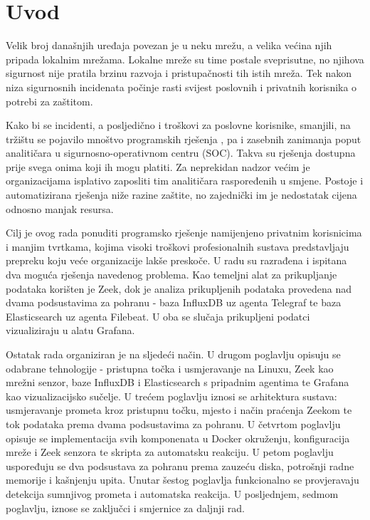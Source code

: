 \chapter{Uvod}


Velik broj današnjih uređaja povezan je u neku mrežu, a velika većina njih pripada lokalnim mrežama. Lokalne mreže su time 
postale sveprisutne, no njihova sigurnost nije pratila brzinu razvoja i pristupačnosti tih istih mreža. Tek nakon niza sigurnosnih incidenata počinje rasti svijest 
poslovnih i privatnih korisnika o potrebi za zaštitom.

Kako bi se incidenti, a posljedično i troškovi za poslovne korisnike, smanjili, na tržištu se pojavilo mnoštvo programskih rješenja 
\cite{splunk_docs}\cite{security_onion}, pa i zasebnih zanimanja poput analitičara u sigurnosno-operativnom centru (SOC). Takva su rješenja dostupna 
prije svega onima koji ih mogu platiti. Za neprekidan nadzor većim je organizacijama isplativo zaposliti tim analitičara raspoređenih u smjene. Postoje i 
automatizirana rješenja niže razine zaštite, no zajednički im je nedostatak cijena odnosno manjak resursa.

Cilj je ovog rada ponuditi programsko rješenje namijenjeno privatnim korisnicima i manjim tvrtkama, kojima visoki troškovi profesionalnih sustava predstavljaju 
prepreku koju veće organizacije lakše preskoče. U radu su razrađena i ispitana dva moguća rješenja navedenog problema. Kao temeljni alat za prikupljanje podataka 
korišten je Zeek, dok je analiza prikupljenih podataka provedena nad dvama podsustavima za pohranu - baza InfluxDB uz agenta Telegraf te baza Elasticsearch uz agenta Filebeat. 
U oba se slučaja prikupljeni podatci vizualiziraju u alatu Grafana.

Ostatak rada organiziran je na sljedeći način. U drugom poglavlju opisuju se odabrane tehnologije - pristupna točka i usmjeravanje na Linuxu, Zeek kao mrežni 
senzor, baze InfluxDB i Elasticsearch s pripadnim agentima te Grafana kao vizualizacijsko sučelje. U trećem poglavlju iznosi se arhitektura sustava: usmjeravanje 
prometa kroz pristupnu točku, mjesto i način praćenja Zeekom te tok podataka prema dvama podsustavima za pohranu. U četvrtom poglavlju opisuje se implementacija 
svih komponenata u Docker okruženju, konfiguracija mreže i Zeek senzora te skripta za automatsku reakciju. U petom poglavlju uspoređuju se dva podsustava za 
pohranu prema zauzeću diska, potrošnji radne memorije i kašnjenju upita. Unutar šestog poglavlja funkcionalno se provjeravaju detekcija sumnjivog prometa i 
automatska reakcija. U posljednjem, sedmom poglavlju, iznose se zaključci i smjernice za daljnji rad.